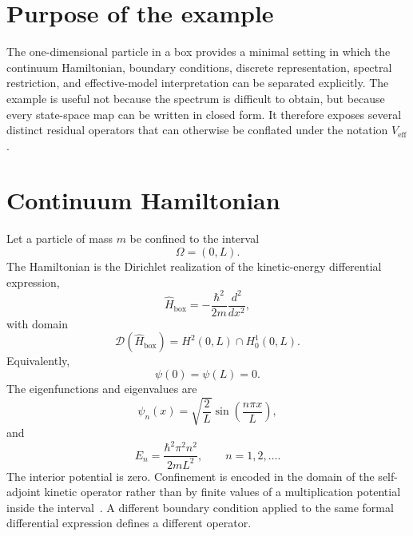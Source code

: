 
\section*{Purpose of the example}

The one-dimensional particle in a box provides a minimal setting in which the
continuum Hamiltonian, boundary conditions, discrete representation, spectral
restriction, and effective-model interpretation can be separated explicitly.
The example is useful not because the spectrum is difficult to obtain, but
because every state-space map can be written in closed form. It therefore
exposes several distinct residual operators that can otherwise be conflated
under the notation $V_{\mathrm{eff}}$.

\section*{Continuum Hamiltonian}

Let a particle of mass $m$ be confined to the interval
\begin{equation}
    \Omega=(0,L).
\end{equation}
The Hamiltonian is the Dirichlet realization of the kinetic-energy differential
expression,
\begin{equation}
    \hat H_{\mathrm{box}}
    =
    -\frac{\hbar^2}{2m}
    \frac{d^2}{dx^2},
\end{equation}
with domain
\begin{equation}
    \mathcal D(\hat H_{\mathrm{box}})
    =
    H^2(0,L)\cap H_0^1(0,L).
\end{equation}
Equivalently,
\begin{equation}
    \psi(0)=\psi(L)=0.
\end{equation}
The eigenfunctions and eigenvalues are
\begin{equation}
    \psi_n(x)
    =
    \sqrt{\frac{2}{L}}
    \sin\left(\frac{n\pi x}{L}\right),
\end{equation}
and
\begin{equation}
    E_n
    =
    \frac{\hbar^2\pi^2n^2}{2mL^2},
    \qquad
    n=1,2,\ldots.
\end{equation}
The interior potential is zero. Confinement is encoded in the domain of the
self-adjoint kinetic operator rather than by finite values of a multiplication
potential inside the interval~\cite{bonneau2001,angelone2024}. A different
boundary condition applied to the same formal differential expression defines
a different operator.

